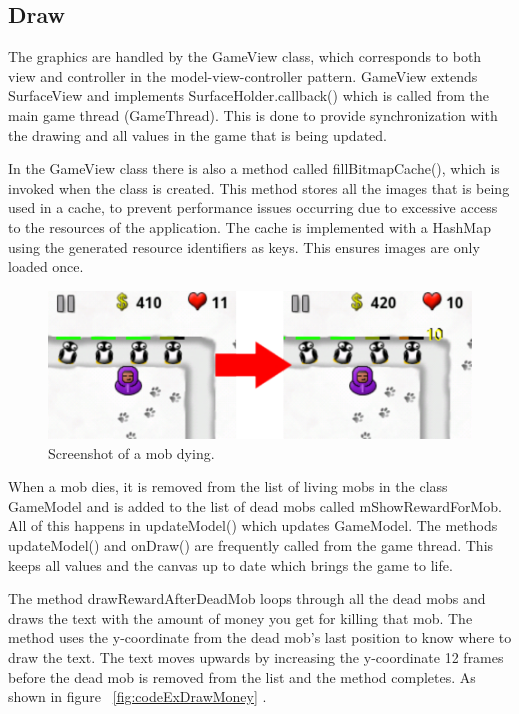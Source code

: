 \subsection{Draw}

The graphics are handled by the GameView class, which corresponds to both view and controller in the model-view-controller pattern. GameView extends SurfaceView and implements SurfaceHolder.callback() which is called from the main game thread (GameThread). This is done to provide synchronization with the drawing and all values in the game that is being updated. 

In the GameView class there is also a method called fillBitmapCache(), which is invoked when the class is created. This method stores all the images that is being used in a cache, to prevent performance issues occurring due to excessive access to the resources of the application. The cache is implemented with a HashMap using the generated resource identifiers as keys. This ensures images are only loaded once.
\clearpage
\begin{figure}[here]
\begin{center}
\includegraphics[scale=1]{pics/chapters/chapter4/showmoney}
\end{center}
\caption{Screenshot of a mob dying.}
\label{fig:dyingMob}
\end{figure}

When a mob dies, it is removed from the list of living mobs in the class GameModel and is added to the list of dead mobs called mShowRewardForMob. All of this happens in updateModel() which updates GameModel. The methods updateModel() and onDraw() are frequently called from the game thread. This keeps all values and the canvas up to date which brings the game to life.

The method drawRewardAfterDeadMob loops through all the dead mobs and draws the text with the amount of money you get for killing that mob. The method uses the y-coordinate from the dead mob's last position to know where to draw the text. The text moves upwards by increasing the y-coordinate 12 frames before the dead mob is removed from the list and the method completes. As shown in figure ~\ref{fig:codeExDrawMoney} .

